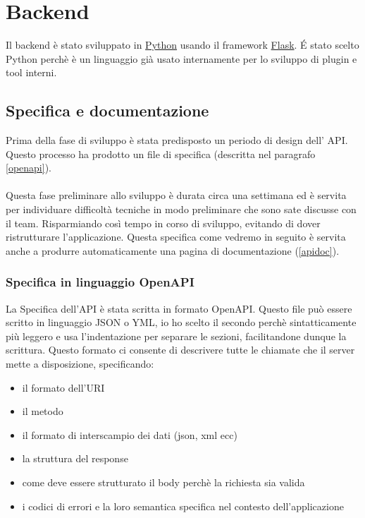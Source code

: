 \chapter{Backend}
        Il backend è stato sviluppato in \href{https://www.python.org}{Python} usando il framework \href{https://flask.palletsprojects.com/en/1.1.x/}{Flask}.
        \'E stato scelto Python perchè è un linguaggio già usato internamente per lo sviluppo di plugin e tool interni.

        \section{Specifica e documentazione}
            Prima della fase di sviluppo è stata predisposto un periodo di design dell' API.
            Questo processo ha prodotto un file di specifica (descritta nel paragrafo 
            \ref{openapi}).\\\\
            Questa fase preliminare allo sviluppo è durata circa una settimana ed è servita per 
            individuare difficoltà tecniche in modo preliminare che sono sate discusse con il team.
            Risparmiando così tempo in corso di sviluppo, evitando di dover ristrutturare l'applicazione.
            Questa specifica come vedremo in seguito è servita anche a produrre automaticamente una pagina di documentazione (\ref{apidoc}).
                
            \subsection{Specifica in linguaggio OpenAPI\label{openapi}}
                La Specifica dell'API è stata scritta in formato OpenAPI.
                Questo file può essere scritto in linguaggio JSON o YML, io ho scelto il secondo perchè
                sintatticamente più leggero e usa l'indentazione per separare le sezioni, facilitandone dunque la scrittura. 
                Questo formato ci consente di descrivere tutte le chiamate che il server 
                mette a disposizione, specificando:
                \begin{itemize}
                    \item il formato dell'URI 
                    \item il metodo
                    \item il formato di interscampio dei dati (json, xml ecc) 
                    \item la struttura del response 
                    \item come deve essere strutturato il body perchè la richiesta sia valida
                    \item i codici di errori e la loro semantica specifica nel contesto dell'applicazione
                \end{itemize}
                
